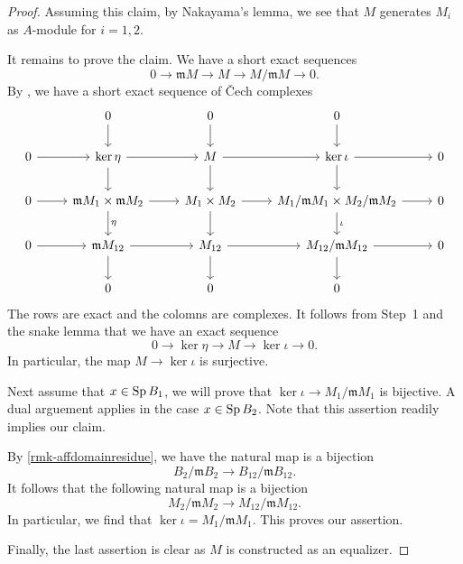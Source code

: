 \begin{proof}
    Assuming this claim, by Nakayama's lemma, we see that $M$ generates $M_i$ as $A$-module for $i=1,2$. 

    It remains to prove the claim. We have a short exact sequences
    \[
        0\rightarrow \mathfrak{m}M\rightarrow M\rightarrow M/\mathfrak{m}M\rightarrow 0.  
    \]
    By \cite[\href{https://stacks.math.columbia.edu/tag/03OM}{Tag 03OM}]{stacks-project}, we have a short exact sequence of \v{C}ech complexes
    \[
        \begin{tikzcd}
            & 0 \arrow[d]                                                       & 0 \arrow[d]                       & 0 \arrow[d]                                                                &   \\
0 \arrow[r] & \ker \eta \arrow[r] \arrow[d]                                     & M \arrow[r] \arrow[d]             & \ker \iota \arrow[r] \arrow[d]                                             & 0 \\
0 \arrow[r] & \mathfrak{m}M_1\times \mathfrak{m}M_2 \arrow[r] \arrow[d, "\eta"] & M_1\times M_2 \arrow[r] \arrow[d] & M_1/\mathfrak{m}M_1\times M_2/\mathfrak{m}M_2 \arrow[r] \arrow[d, "\iota"] & 0 \\
0 \arrow[r] & \mathfrak{m}M_{12} \arrow[r] \arrow[d]                            & M_{12} \arrow[r] \arrow[d]        & M_{12}/\mathfrak{m}M_{12} \arrow[r] \arrow[d]                              & 0 \\
            & 0                                                                 & 0                                 & 0                                                                          &  
\end{tikzcd}
    \]
    The rows are exact and the colomns are complexes. It follows from Step~1 and the snake lemma that we have an exact sequence
    \[
        0\rightarrow \ker \eta\rightarrow M\rightarrow \ker \iota\rightarrow 0.  
    \]
    In particular, the map $M\rightarrow \ker \iota$ is surjective. 
    
    
    Next assume that $x\in \operatorname{Sp} B_1$, we will prove that $\ker \iota\rightarrow M_1/\mathfrak{m} M_1$ is bijective. A dual arguement applies in the case $x\in \operatorname{Sp} B_2$.  Note that this assertion readily implies our claim.

    By \cref{rmk-affdomainresidue}, we have the natural map is a bijection
    \[
        B_2/\mathfrak{m}B_2\rightarrow B_{12}/\mathfrak{m}B_{12}. 
    \]
    It follows that the following natural map is a bijection
    \[
        M_2/\mathfrak{m}M_2\rightarrow M_{12}/\mathfrak{m}M_{12}.  
    \]
    In particular, we find that $\ker \iota=M_1/\mathfrak{m}M_1$. This proves our assertion.

    Finally, the last assertion is clear as $M$ is constructed as an equalizer.
\end{proof}


\printbibliography

